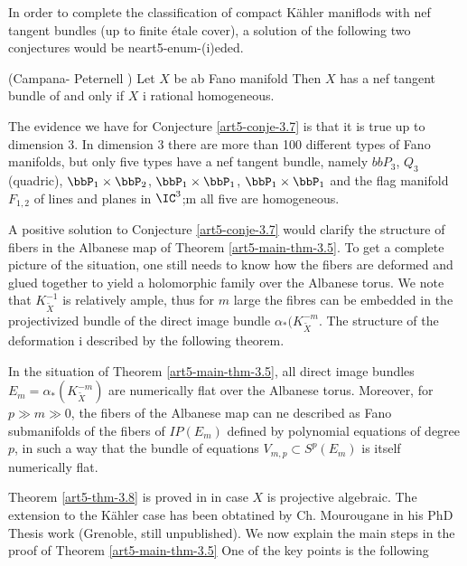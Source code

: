 In order to complete the classification of compact K\"ahler maniflods with nef tangent bundles (up to finite \'etale cover), a solution of the following two conjectures would be neart5-enum-(i)eded.

\begin{conjecture}\label{art5-conje-3.7}
(Campana- Peternell \cite{art5-keyCP91}) Let $X$ be ab Fano manifold Then $X$ has a nef tangent bundle of and only if $X$ i rational homogeneous.
\end{conjecture}

The evidence we have for Conjecture \ref{art5-conje-3.7} is that it is true up to dimension 3. In dimension 3 there are more than 100 different types of Fano manifolds, but only five types have a nef tangent bundle, namely $bbP_{3}$, $Q_{3}$ (quadric), $\bbP_{1}\times \bbP_{2}$, $\bbP_{1}\times \bbP_{1}$, $\bbP_{1}\times \bbP_{1}$ and the flag manifold $F_{1,2}$ of lines and planes in $\IC^{3}$;m all five are homogeneous.   

A positive solution to Conjecture \ref{art5-conje-3.7} would clarify the structure of fibers in the Albanese map of Theorem \ref{art5-main-thm-3.5}. To get a complete picture of the situation, one still needs to know how the fibers are deformed and glued together to yield a holomorphic family over the Albanese torus. We note that $K_{\widetilde{X}}^{-1}$ is relatively ample, thus for $m$ large the fibres can be embedded in the projectivized bundle of the direct image bundle $\alpha_{*}(K_{\widetilde{X}}^{-m}$. The structure of the deformation i described by the following theorem.

\begin{theorem}\label{art5-thm-3.8}
In the situation of Theorem \ref{art5-main-thm-3.5}, all direct image bundles $E_{m}= \alpha_{*}(K_{\widetilde{X}}^{-m})$ are numerically flat over the Albanese torus. Moreover, for $p \gg m \gg 0$, the fibers of the Albanese map can ne described as Fano submanifolds of the fibers of $IP(E_{m})$ defined by polynomial equations of degree $p$, in such a way that the bundle of equations $V_{m, p} \subset S^{p}(E_{m})$ is itself numerically flat.
\end{theorem}

Theorem \ref{art5-thm-3.8} is proved in \cite{art5-keyDPS91} in case $X$ is projective algebraic. The extension to the K\"ahler case has been obtatined by Ch. Mourougane in his PhD Thesis work (Grenoble, still unpublished). We now explain the main steps in the proof of Theorem \ref{art5-main-thm-3.5} One of the key points is the following

